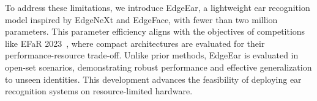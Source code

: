 To address these limitations, we introduce EdgeEar, a lightweight ear recognition model inspired by EdgeNeXt and EdgeFace, with fewer than two million parameters. This parameter efficiency aligns with the objectives of competitions like EFaR 2023~\cite{Kolf2023EFaR}, where compact architectures are evaluated for their performance-resource trade-off. Unlike prior methods, EdgeEar is evaluated in open-set scenarios, demonstrating robust performance and effective generalization to unseen identities. This development advances the feasibility of deploying ear recognition systems on resource-limited hardware.



